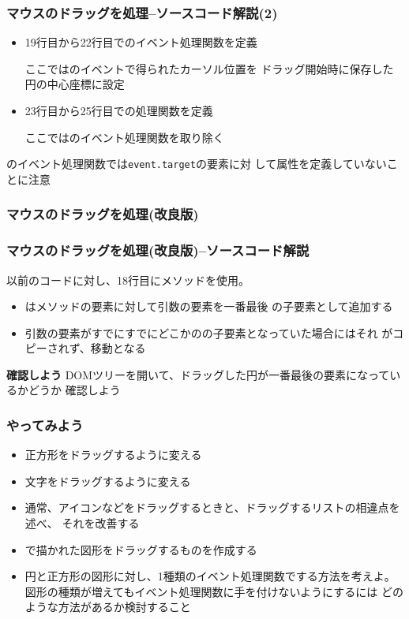\begin{frame}
 \frametitle{マウスのドラッグを処理--ソースコード解説(2)}
\begin{itemize}
\item 19行目から22行目でのイベント処理関数を定義

      ここではのイベントで得られたカーソル位置を
      ドラッグ開始時に保存した円の中心座標に設定
 \item 23行目から25行目での処理関数を定義

       ここではのイベント処理関数を取り除く
\end{itemize}

 のイベント処理関数では\texttt{event.target}の要素に対
 して属性を定義していないことに注意
\end{frame}
\begin{frame}[containsverbatim]
 \frametitle{マウスのドラッグを処理(改良版)}
\end{frame}
\begin{frame}[containsverbatim]
 \frametitle{マウスのドラッグを処理(改良版)--ソースコード解説}
以前のコードに対し、18行目にメソッドを使用。
 \begin{itemize}
  \item {}はメソッドの要素に対して引数の要素を一番最後
        の子要素として追加する
  \item 引数の要素がすでにすでにどこかのの子要素となっていた場合にはそれ
        がコピーされず、移動となる
 \end{itemize}
 {\bfseries 確認しよう}
 DOMツリーを開いて、ドラッグした円が一番最後の要素になっているかどうか
 確認しよう
\end{frame}
\begin{frame}[containsverbatim]
 \frametitle{やってみよう}
\begin{itemize}
 \item 正方形をドラッグするように変える
 \item 文字をドラッグするように変える
 \item 通常、アイコンなどをドラッグするときと、ドラッグするリストの相違点を述べ、
			 それを改善する
 \item {}で描かれた図形をドラッグするものを作成する
 \item 円と正方形の図形に対し、1種類のイベント処理関数でする方法を考えよ。
			 図形の種類が増えてもイベント処理関数に手を付けないようにするには
			 どのような方法があるか検討すること
\end{itemize}
\end{frame}

\begin{frame}[containsverbatim]
 \frametitle{}
\end{frame}
